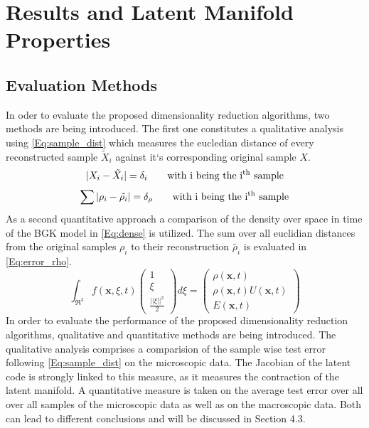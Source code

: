 \documentclass[12pt, a4paper]{article}
\newcommand{\colvec}[1]{\ensuremath{\begin{pmatrix}#1\end{pmatrix}}}
\begin{document}
\section{Results and Latent Manifold Properties}
\subsection{Evaluation Methods}
In oder to evaluate the proposed dimensionality reduction algorithms, two methods are being introduced. The first one constitutes a qualitative analysis using \cref{Eq:sample_dist} which measures the eucledian distance of every reconstructed sample $\tilde{X}_i$ against it`s corresponding original sample $X$.
\begin{equation}
	|X_i-\tilde{X_i}| = \delta_i \qquad\textrm{with i being the i\textsuperscript{th} sample}
	\label{Eq:sample_dist}
\end{equation}
\begin{equation}
	\sum|\rho_i-\tilde{\rho_i}|=\delta_\rho \qquad\textrm{with i being the i\textsuperscript{th} sample}
	\label{Eq:error_rho}
\end{equation}
As a second quantitative approach a comparison of the density over space in time of the BGK model in \cref{Eq:dense} is utilized. The sum over all euclidian distances from the original samples $\rho_i$ to their reconstruction $\tilde{\rho_i}$ is evaluated in \cref{Eq:error_rho}. 
\begin{equation}
\int_{\Re^3}f(\textbf{x},\xi,t)\colvec{1\\\xi\\\frac{||\xi||^2}{2}}d\xi= \colvec{\rho(\textbf{x},t)\\\rho(\textbf{x},t)U(\textbf{x},t)\\E(\textbf{x},t)}
\label{Eq:dense}
\end{equation}
In order to evaluate the performance of the proposed dimensionality reduction algorithms, qualitative and quantitative methods are being introduced. The qualitative analysis comprises a comparision of the sample wise test error following \cref{Eq:sample_dist} on the microscopic data. The Jacobian of the latent code is strongly linked to this measure, as it measures the contraction of the latent manifold. A quantitative measure is taken on the average test error over all over all samples of the microscopic data as well as on the macroscopic data. Both can lead to different conclusions and will be discussed in Section 4.3.
\end{document}
